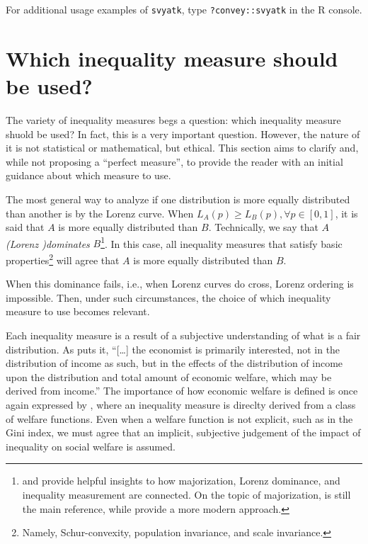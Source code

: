 \documentclass[
]{book}
\begin{document}
For additional usage examples of \texttt{svyatk}, type \texttt{?convey::svyatk} in the R console.

\hypertarget{which-inequality-measure-should-be-used}{%
\section{Which inequality measure should be used?}\label{which-inequality-measure-should-be-used}}

The variety of inequality measures begs a question: which inequality measure shuold be used? In fact, this is a very important question. However, the nature of it is not statistical or mathematical, but ethical. This section aims to clarify and, while not proposing a ``perfect measure'', to provide the reader with an initial guidance about which measure to use.

The most general way to analyze if one distribution is more equally distributed than another is by the Lorenz curve. When \(L_A(p) \geqslant L_B(p), \forall p \in [0,1]\), it is said that \(A\) is more equally distributed than \(B\). Technically, we say that \(A\) \emph{(Lorenz )dominates} \(B\)\footnote{\textcite{kramer1998} and \textcite{mosler1994} provide helpful insights to how majorization, Lorenz dominance, and inequality measurement are connected. On the topic of majorization, \textcite{hardy1934} is still the main reference, while \textcite{olkin2011} provide a more modern approach.}. In this case, all inequality measures that satisfy basic properties\footnote{Namely, Schur-convexity, population invariance, and scale invariance.} will agree that \(A\) is more equally distributed than \(B\).

When this dominance fails, i.e., when Lorenz curves do cross, Lorenz ordering is impossible. Then, under such circumstances, the choice of which inequality measure to use becomes relevant.

Each inequality measure is a result of a subjective understanding of what is a fair distribution. As \textcite[p.348]{dalton1920} puts it, ``{[}\ldots{]} the economist is primarily interested, not in the distribution of income as such, but in the effects of the distribution of income upon the distribution and total amount of economic welfare, which may be derived from income.'' The importance of how economic welfare is defined is once again expressed by \textcite{atkinson1970}, where an inequality measure is direclty derived from a class of welfare functions. Even when a welfare function is not explicit, such as in the Gini index, we must agree that an implicit, subjective judgement of the impact of inequality on social welfare is assumed.
\end{document}
